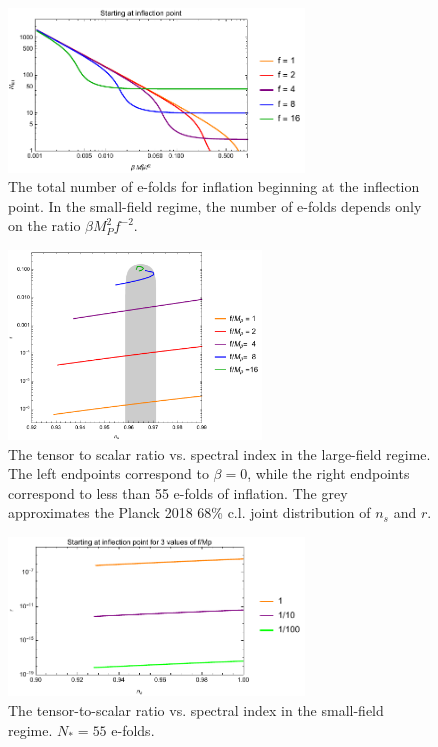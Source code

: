 \documentclass[aps,amsfonts,amsmath,prd,preprint,nofootinbib,superscriptaddress]{revtex4}
\newcommand{\MMp}{{M_P^2}}
\begin{document}
\begin{figure}[!h]
  \centering
    \includegraphics[width=0.7\textwidth]{figures/NvsBetaf-2.pdf}
    \caption{The total number of e-folds for inflation beginning at the inflection point.  In the small-field regime, the number of e-folds depends only on the ratio $\beta \MMp f^{-2}.$}
\end{figure}

\begin{figure}[!h]
  \centering
    \includegraphics[width=0.6\textwidth]{figures/nsrplotvsf.pdf}
    \caption{The tensor to scalar ratio vs. spectral index in the large-field regime.  
    The left endpoints correspond to $\beta = 0$, while the right endpoints correspond to less than 55 e-folds of inflation.  The grey approximates the Planck 2018 68\% c.l. joint distribution
    of $n_s$ and $r$.}
\end{figure}


\begin{figure}[!h]
  \centering
    \includegraphics[width=0.7\textwidth]{figures/rvsnsplot.pdf}
    \caption{The tensor-to-scalar ratio vs. spectral index in the small-field regime.  $N_\ast = 55$ e-folds.}
\end{figure}
\end{document}
